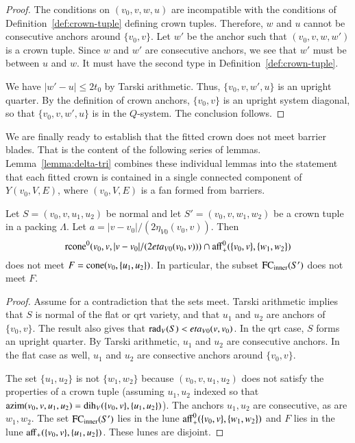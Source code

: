 \begin{proof} The conditions on $(v_0,v,w,u)$ are incompatible with the
conditions of Definition~\ref{def:crown-tuple} defining crown tuples.
Therefore, $w$ and $u$ cannot be consecutive anchors around
$\{v_0,v\}$.  Let $w'$ be the anchor such that $(v_0,v,w,w')$
is a crown tuple.  Since $w$ and $w'$ are consecutive anchors,
we see that $w'$ must be between $u$ and $w$.  It must have the
second type in Definition~\ref{def:crown-tuple}.  

We have $|w'-u|\le 2t_0$ by Tarski arithmetic.  
Thus, $\{v_0,v,w',u\}$
is an upright quarter.  By the definition of crown anchors, $\{v_0,v\}$
is an upright system diagonal, so that $\{v_0,v,w',u\}$ is in
the $Q$-system.
The conclusion follows.
\end{proof}

We are finally ready to establish that the fitted crown does not meet 
barrier blades.  That is the content of the following series of lemmas.
Lemma~\ref{lemma:delta-tri} combines these individual lemmas into the statement that each
fitted crown is contained in a single connected component of $Y(v_0,V,E)$, where
$(v_0,V,E)$ is a fan formed from barriers.

\begin{lemma}  
Let $S=(v_0,v,u_1,u_2)$ be normal and
let $S'=(v_0,v,w_1,w_2)$ be a crown tuple in a packing $\Lambda$.
Let $a = |v-v_0|/(2\eta_{V0}(v_0,v))$.  
Then
$$
 {\operatorname{rcone}}^0(v_0,v,|v-v_0|/(2eta_{V0}(v_0,v))) \cap
  {\operatorname{aff}}^0_+(\{v_0,v\},\{w_1,w_2\})
$$
does not meet $F={\operatorname{cone}}(v_0,\{u_1,u_2\})$.
In particular, the subset
${\operatorname{FC}}_{\text{inner}}(S')$ does not meet $F$.
\end{lemma}

\begin{proof}  Assume for a contradiction that the sets meet.
Tarski arithmetic
implies that $S$ is normal of the flat or qrt variety, and 
that $u_1$ and $u_2$ are anchors of $\{v_0,v\}$.  
The result also gives that 
$\operatorname{rad}_V(S)<eta_{V0}(v,v_0)$.    
In the qrt case, $S$ forms
an upright quarter.  By Tarski arithmetic, $u_1$ and $u_2$
are consecutive anchors. In the flat case as well, 
$u_1$ and $u_2$ are consective
anchors around $\{v_0,v\}$.

The set $\{u_1,u_2\}$ is not $\{w_1,w_2\}$ because $(v_0,v,u_1,u_2)$
does not satisfy the properties of a crown tuple (assuming $u_1,u_2$
indexed so that ${\operatorname{azim}}(v_0,v,u_1,u_2) = \operatorname{dih}_V(\{v_0,v\},\{u_1,u_2\})$).  The anchors $u_1,u_2$ are consecutive, as are $w_1,w_2$.
The set ${\operatorname{FC}}_{\text{inner}}(S')$ lies in the lune ${\operatorname{aff}}_+^0(\{v_0,v\},\{w_1,w_2\})$ and $F$ lies in the lune ${\operatorname{aff}}_+(\{v_0,v\},\{u_1,u_2\})$.
These lunes are disjoint.
%
\end{proof}

